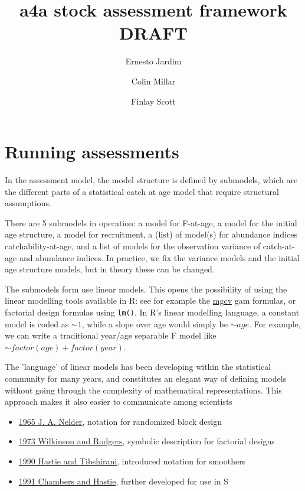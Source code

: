 \documentclass[a4paper,english,10pt]{article}\usepackage[]{graphicx}\usepackage[]{color}
\newcommand{\code}[1]{{\texttt{#1}}}
\begin{document}

\title{a4a stock assessment framework \\ DRAFT}

\author[1]{Ernesto Jardim}
\author[1]{Colin Millar}
\author[1]{Finlay Scott}

\maketitle
\tableofcontents
\newpage

\section{Running assessments}

In the  assessment model, the model structure is defined by submodels, which are the different parts of a statistical catch at age model that require structural assumptions.

There are 5 submodels in operation: a model for F-at-age, a model for the initial age structure, a model for recruitment, a (list) of model(s) for abundance indices catchability-at-age, and a list of models for the observation variance of catch-at-age and abundance indices. In practice, we fix the variance models and the initial age structure models, but in theory these can be changed.

The submodels form use linear models. This opens the possibility of using the linear modelling tools available in R: see for example the \href{http://cran.r-project.org/web/packages/mgcv/index.html}{mgcv} gam formulas, or factorial design formulas using \code{lm()}. In R's linear modelling language, a constant model is coded as $\sim 1$, while a slope over age would simply be $\sim age$. For example, we can write a traditional year/age separable F model like $\sim factor(age) + factor(year)$.

The 'language' of linear models has been developing within the statistical community for many years, and constitutes an elegant way of defining models without going through the complexity of mathematical representations. This approach makes it also easier to communicate among scientists 
  \begin{itemize}
  \item \href{http://rspa.royalsocietypublishing.org/content/283/1393/147.short}{1965 J. A. Nelder}, notation for randomized block design
  \item \href{http://www.jstor.org/stable/info/2346786}{1973 Wilkinson and Rodgers}, symbolic description for factorial designs
  \item \href{http://books.google.com/books?isbn=0412343908}{1990 Hastie and Tibshirani}, introduced notation for smoothers
  \item \href{http://books.google.com/books?isbn=041283040X}{1991 Chambers and Hastie}, further developed for use in S
  \end{itemize}
\end{document}
